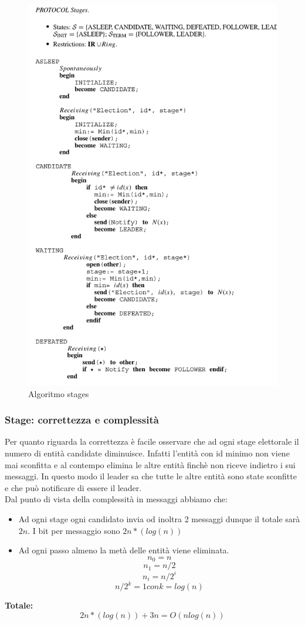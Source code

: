 \documentclass[12pt]{article}
\begin{document}
			\begin{figure}[h!]
				\centering
				\includegraphics[scale=0.50]{img/stages.png}
				\caption{Algoritmo stages}
			\end{figure}
		
		\subsubsection{Stage: correttezza e complessità}	
			Per quanto riguarda la correttezza è facile osservare che ad ogni stage elettorale il numero di entità candidate diminuisce. Infatti l'entità con id minimo non viene mai sconfitta e al contempo elimina le altre entità finchè non riceve indietro i sui messaggi. In questo modo il leader sa che tutte le altre entità sono state sconfitte e che può notificare di essere il leader.\\
			Dal punto di vista della complessità in messaggi abbiamo che:
			\begin{itemize}
				\item Ad ogni stage ogni candidato invia od inoltra 2 messaggi dunque il totale sarà  $2n$.  I bit per messaggio sono $2n*(log(n))$
				\item Ad ogni passo almeno la metà delle entità viene eliminata.
				 $$n_0 = n$$
				 $$n_1 = n/2$$
				 $$n_i = n/2^i $$
				 $$n/2^k = 1 conk=log(n) $$
			\end{itemize}
			\textbf{Totale:}
			$$2n*(log(n))+3n = O(nlog(n)) $$
			
\end{document}
